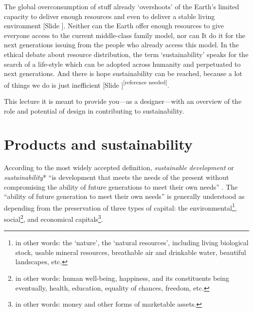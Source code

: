 \documentclass{article}
\newcounter{slide}
\begin{document}
The global overconsumption of stuff already `overshoots' of the Earth's limited capacity to deliver enough resources and even to deliver a stable living environment \cite{rockstromPlanetaryBoundariesExploring2009} {\color{blue}[Slide ]}. Neither can the Earth offer enough resources to give everyone access to the current middle-class family model, nor can It do it for the next generations issuing from the people who already access this model. In the ethical debate about resource distribution, the term `sustainability' speaks for the search of a life-style which can be adopted across humanity and perpetuated to next generations. And there is hope sustainability can be reached, because a lot of things we do is just inefficient {\color{blue}[Slide ]}{\color{red}\textsuperscript{[reference needed]}}. %

This lecture it is meant to provide you---as a designer---with an overview of the role and potential of design in contributing to sustainability. 

\section{Products and sustainability}
\label{sec:sustainability}

According to the most widely accepted definition, \emph{sustainable development} or \emph{sustainability}* ``is development that meets the needs of the present without compromising the ability of future generations to meet their own needs'' \cite{brundtland1987our}. The ``ability of future generation to meet their own needs'' is generally understood as depending from the preservation of three types of capital: the environmental\footnote{in other words: the `nature', the `natural resources', including living biological stock, usable mineral resources, breathable air and drinkable water, beautiful landscapes, etc.}, social\footnote{in other words: human well-being, happiness, and its constituents being eventually, health, education, equality of chances, freedom, etc.}, and economical capitals\footnote{in other words: money and other forms of marketable assets.}. 
\end{document}
